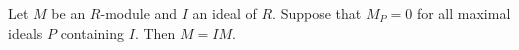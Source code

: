 Let $M$ be an $R$-module and $I$ an ideal of $R$. Suppose that $M_P = 0$ for all
maximal ideals $P$ containing $I$. Then $M = IM$.
